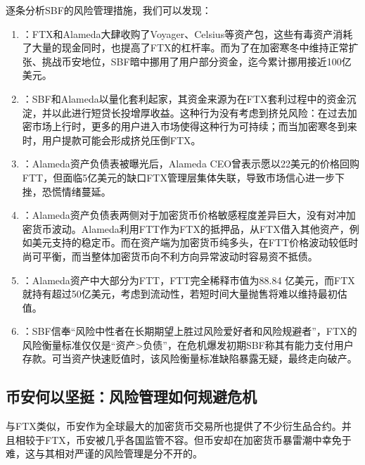 逐条分析SBF的风险管理措施，我们可以发现：
\begin{enumerate}
    \item \textbf{}：FTX和Alameda大肆收购了Voyager、Celsius等资产包，这些有毒资产消耗了大量的现金同时，也提高了FTX的杠杆率。而为了在加密寒冬中维持正常扩张、挑战币安地位，SBF暗中挪用了用户部分资金，迄今累计挪用接近100亿美元。
    \item \textbf{}：SBF和Alameda以量化套利起家，其资金来源为在FTX套利过程中的资金沉淀，并以此进行短贷长投增厚收益。这种行为没有考虑到挤兑风险：在过去加密市场上行时，更多的用户进入市场使得这种行为可持续；而当加密寒冬到来时，用户提款可能会形成挤兑压倒FTX。
    \item \textbf{}：Alameda资产负债表被曝光后，Alameda CEO曾表示愿以22美元的价格回购FTT，但面临5亿美元的缺口FTX管理层集体失联，导致市场信心进一步下挫，恐慌情绪蔓延。
    \item \textbf{}：Alameda资产负债表两侧对于加密货币价格敏感程度差异巨大，没有对冲加密货币波动。Alameda利用FTT作为FTX的抵押品，从FTX借入其他资产，例如美元支持的稳定币。而在资产端为加密货币纯多头，在FTT价格波动较低时尚可平衡，而当整体加密货币向不利方向异常波动时容易资不抵债。
    \item \textbf{}：Alameda资产中大部分为FTT，FTT完全稀释市值为88.84 亿美元，而FTX就持有超过50亿美元，考虑到流动性，若短时间大量抛售将难以维持最初估值。
    \item \textbf{}：SBF信奉“风险中性者在长期期望上胜过风险爱好者和风险规避者”，FTX的风险衡量标准仅仅是“资产>负债”，在危机爆发初期SBF称其有能力支付用户存款。可当资产快速贬值时，该风险衡量标准缺陷暴露无疑，最终走向破产。
\end{enumerate}

\subsection{币安何以坚挺：风险管理如何规避危机}
与FTX类似，币安作为全球最大的加密货币交易所也提供了不少衍生品合约。并且相较于FTX，币安被几乎各国监管不容。但币安却在加密货币暴雷潮中幸免于难，这与其相对严谨的风险管理是分不开的。

